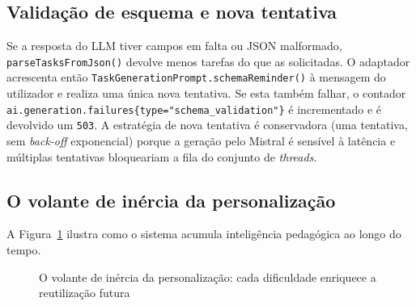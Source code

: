 \subsection*{Validação de esquema e nova tentativa}

Se a resposta do LLM tiver campos em falta ou JSON malformado,
\texttt{parseTasksFromJson()} devolve menos tarefas do que as solicitadas.
O adaptador acrescenta então \texttt{TaskGenerationPrompt.schemaReminder()}
à mensagem do utilizador e realiza uma única nova tentativa.
Se esta também falhar, o contador
\texttt{ai.generation.failures\{type="schema\_validation"\}} é
incrementado e é devolvido um \texttt{503}.
A estratégia de nova tentativa é conservadora (uma tentativa, sem
\textit{back-off} exponencial) porque a geração pelo Mistral é sensível à
latência e múltiplas tentativas bloqueariam a fila do conjunto de
\textit{threads}.

\subsection*{O volante de inércia da personalização}

A Figura~\ref{fig:volante_personalizacao} ilustra como o sistema acumula
inteligência pedagógica ao longo do tempo.

\begin{figure}[htbp]
  \centering
  \caption{O volante de inércia da personalização: cada dificuldade enriquece a reutilização futura}
  \label{fig:volante_personalizacao}
\end{figure}


